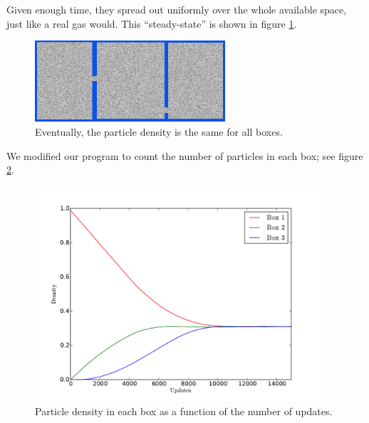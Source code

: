 \documentclass[12pt,a4paper]{article}
\begin{document}
Given enough time, they spread out uniformly over the whole available space, just like a real gas would.
This ``steady-state'' is shown in figure \ref{diffusionend}.
\begin{figure}[htp]
\centering
  \includegraphics[width=200pt]{figs/diffusionend.png}
\caption{Eventually, the particle density is the same for all boxes.}
\label{diffusionend}
\end{figure}

We modified our program to count the number of particles in each box; see figure \ref{gascount}.
\begin{figure}[htp]
\centering
  \includegraphics[width=300pt]{figs/gascount.pdf}
\caption{Particle density in each box as a function of the number of updates.}
\label{gascount}
\end{figure}
\end{document}
